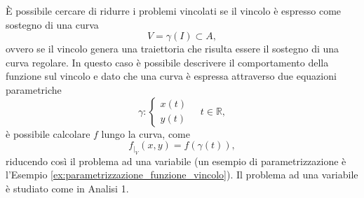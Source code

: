 È possibile cercare di ridurre i problemi vincolati se il vincolo è espresso come sostegno di una curva
\begin{equation*}
	V = \gamma (I)\subset A,
\end{equation*}
ovvero se il vincolo genera una traiettoria che risulta essere il sostegno di una curva regolare. In questo caso è possibile descrivere il comportamento della funzione sul vincolo e dato che una curva è espressa attraverso due equazioni parametriche
\begin{equation*}
	\gamma:
	\begin{cases}
		x(t)\\
		y(t)
	\end{cases}\quad t\in\mathbb{R},
\end{equation*}
è possibile calcolare $f$ lungo la curva, come
\begin{equation*}
	f_{|_{V}} (x,y)= f(\gamma(t)),
\end{equation*}
riducendo così il problema ad una variabile (un esempio di parametrizzazione è l'Esempio \ref{ex:parametrizzazione_funzione_vincolo}). Il problema ad una variabile è studiato come in Analisi 1.


